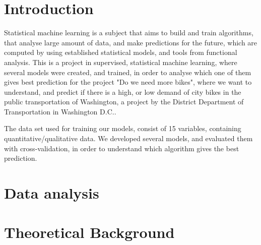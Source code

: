 \section{Introduction}
Statistical machine learning is a subject that aims to build and train algorithms, that analyse large amount of data, and make predictions for the future, which are computed by using established statistical models, and tools from functional analysis. This is a project in supervised, statistical machine learning, where several models were created, and trained, in order to analyse which one of them gives best prediction for the project "Do we need more bikes", where we want to understand, and predict if there is a high, or low demand of city bikes in the public transportation of Washington, a project by the District Department of Transportation in Washington D.C..

The data set used for training our models, consist of 15 variables, containing quantitative/qualitative data. We developed several models, and evaluated them with cross-validation, in order to understand which algorithm gives the best prediction. 



\section{Data analysis}

















\section{Theoretical Background}


